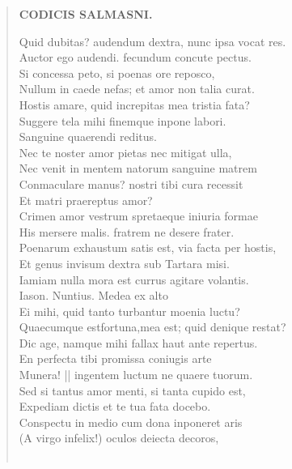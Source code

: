 \documentclass[11pt, a4paper]{report}
\begin{document}
\begin{verse}
    \begin{center} \textbf{CODICIS SALMASNI.} \end{center}Quid dubitas? audendum dextra, nunc ipsa vocat res. \\ Auctor ego audendi. fecundum concute pectus. \\ Si concessa peto, si poenas ore reposco, \\ Nullum in caede nefas;  \lbrack et \rbrack  amor non talia curat. \\ Hostis amare, quid increpitas mea tristia fata? \\ Suggere tela mihi finemque inpone labori. \\ Sanguine quaerendi reditus. \\ Nec te noster amor pietas nec mitigat ulla, \\ Nec venit in mentem natorum sanguine matrem \\ Conmaculare manus? nostri tibi cura recessit \\ Et matri praereptus amor? \\ Crimen amor vestrum spretaeque iniuria formae \\ His mersere malis. fratrem ne desere frater. \\ Poenarum exhaustum satis est, via facta per hostis, \\ Et genus invisum dextra sub Tartara misi. \\ Iamiam nulla mora est currus agitare volantis. \\ Iason. Nuntius. Medea ex alto \\ Ei mihi, quid tanto turbantur moenia luctu? \\ Quaecumque estfortuna,mea est; quid denique restat? \\ Dic age, namque mihi fallax haut ante repertus. \\ En perfecta tibi promissa coniugis arte \\ Munera! || ingentem luctum ne quaere tuorum. \\ Sed si tantus amor menti, si tanta cupido est, \\ Expediam dictis et te tua fata docebo. \\ Conspectu in medio cum dona inponeret aris \\ (A virgo infelix!) oculos deiecta decoros, \\ 
        ﻿\pagebreak 

\end{verse}
\end{document}
